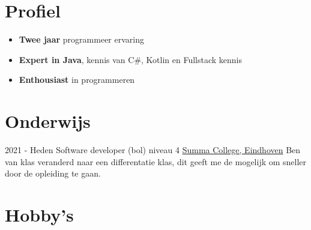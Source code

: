 \documentclass[letterpaper]{twentysecondcv} %
\begin{document}
    \makesidebarFirst %



    \section{Profiel}

    \begin{itemize}
        \item \textbf{Twee jaar} programmeer ervaring
        \item \textbf{Expert in Java}, kennis van C\#, Kotlin en Fullstack kennis
        \item \textbf{Enthousiast} in programmeren
    \end{itemize}

    \vspace{6mm}




    \section{Onderwijs}

    \begin{twenty} %
        \twentyitem
        {2021 -}
        {Heden}
        {Software developer (bol) niveau 4}
        {\href{https://www.summacollege.nl/}{Summa College, Eindhoven}}
        {}
        {
            Ben van klas veranderd naar een differentatie klas, dit geeft me de mogelijk om sneller door de opleiding te gaan.
        }
    \end{twenty}



    \section{Hobby's}
\end{document}

